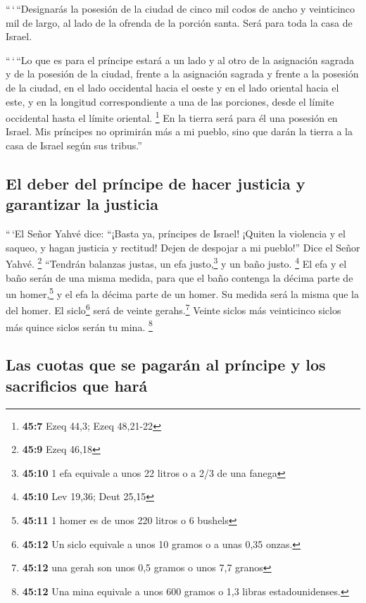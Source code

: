  ``\,`\,``Designarás la posesión de la ciudad de cinco mil
codos de ancho y veinticinco mil de largo, al lado de la ofrenda de la
porción santa. Será para toda la casa de Israel.

 ``\,`\,``Lo que es para el príncipe estará a un lado y al
otro de la asignación sagrada y de la posesión de la ciudad, frente a la
asignación sagrada y frente a la posesión de la ciudad, en el lado
occidental hacia el oeste y en el lado oriental hacia el este, y en la
longitud correspondiente a una de las porciones, desde el límite
occidental hasta el límite oriental. \footnote{\textbf{45:7} Ezeq 44,3;
  Ezeq 48,21-22}  En la tierra será para él una posesión
en Israel. Mis príncipes no oprimirán más a mi pueblo, sino que darán la
tierra a la casa de Israel según sus tribus.''

\hypertarget{el-deber-del-pruxedncipe-de-hacer-justicia-y-garantizar-la-justicia}{%
\subsection{El deber del príncipe de hacer justicia y garantizar la
justicia}\label{el-deber-del-pruxedncipe-de-hacer-justicia-y-garantizar-la-justicia}}

 ``\,`El Señor Yahvé dice: ``¡Basta ya, príncipes de
Israel! ¡Quiten la violencia y el saqueo, y hagan justicia y rectitud!
Dejen de despojar a mi pueblo!'' Dice el Señor Yahvé. \footnote{\textbf{45:9}
  Ezeq 46,18}  ``Tendrán balanzas justas, un efa
justo,\footnote{\textbf{45:10} 1 efa equivale a unos 22 litros o a 2/3
  de una fanega} y un baño justo. \footnote{\textbf{45:10} Lev 19,36;
  Deut 25,15}  El efa y el baño serán de una misma
medida, para que el baño contenga la décima parte de un
homer,\footnote{\textbf{45:11} 1 homer es de unos 220 litros o 6 bushels}
y el efa la décima parte de un homer. Su medida será la misma que la del
homer.  El siclo\footnote{\textbf{45:12} Un siclo
  equivale a unos 10 gramos o a unas 0,35 onzas.} será de veinte
gerahs.\footnote{\textbf{45:12} una gerah son unos 0,5 gramos o unos 7,7
  granos} Veinte siclos más veinticinco siclos más quince siclos serán
tu mina. \footnote{\textbf{45:12} Una mina equivale a unos 600 gramos o
  1,3 libras estadounidenses.}

\hypertarget{las-cuotas-que-se-pagaruxe1n-al-pruxedncipe-y-los-sacrificios-que-haruxe1}{%
\subsection{Las cuotas que se pagarán al príncipe y los sacrificios que
hará}\label{las-cuotas-que-se-pagaruxe1n-al-pruxedncipe-y-los-sacrificios-que-haruxe1}}

